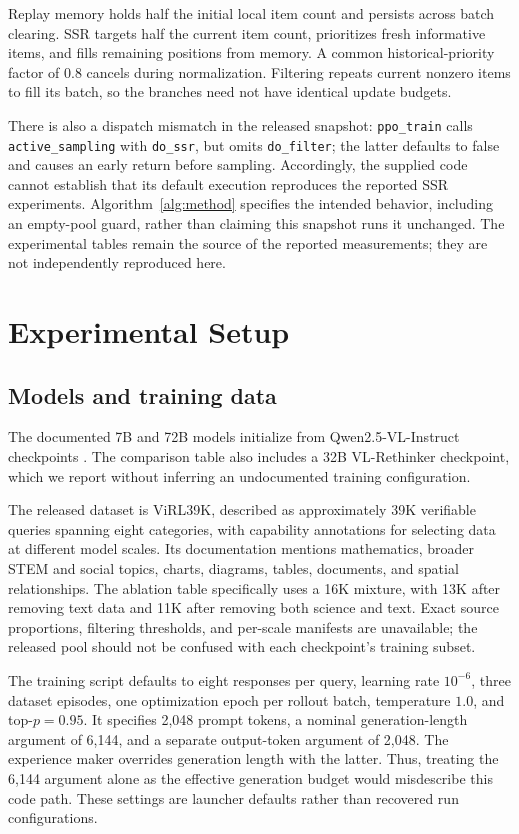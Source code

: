 \documentclass[10pt,twocolumn]{article}
\newcommand{\model}{VL-Rethinker\xspace}
\begin{document}
Replay memory holds half the initial local item count and persists across batch clearing. SSR targets half the current item count, prioritizes fresh informative items, and fills remaining positions from memory. A common historical-priority factor of $0.8$ cancels during normalization. Filtering repeats current nonzero items to fill its batch, so the branches need not have identical update budgets.

There is also a dispatch mismatch in the released snapshot: \texttt{ppo\_train} calls \texttt{active\_sampling} with \texttt{do\_ssr}, but omits \texttt{do\_filter}; the latter defaults to false and causes an early return before sampling. Accordingly, the supplied code cannot establish that its default execution reproduces the reported SSR experiments. Algorithm~\ref{alg:method} specifies the intended behavior, including an empty-pool guard, rather than claiming this snapshot runs it unchanged. The experimental tables remain the source of the reported measurements; they are not independently reproduced here.


\section{Experimental Setup}
\label{sec:setup}
\subsection{Models and training data}
The documented 7B and 72B models initialize from Qwen2.5-VL-Instruct checkpoints \citep{qwen2_5_vl}. The comparison table also includes a 32B \model checkpoint, which we report without inferring an undocumented training configuration. 

The released dataset is ViRL39K, described as approximately 39K verifiable queries spanning eight categories, with capability annotations for selecting data at different model scales. Its documentation mentions mathematics, broader STEM and social topics, charts, diagrams, tables, documents, and spatial relationships. The ablation table specifically uses a 16K mixture, with 13K after removing text data and 11K after removing both science and text. Exact source proportions, filtering thresholds, and per-scale manifests are unavailable; the released pool should not be confused with each checkpoint's training subset.

The training script defaults to eight responses per query, learning rate $10^{-6}$, three dataset episodes, one optimization epoch per rollout batch, temperature $1.0$, and top-$p=0.95$. It specifies 2,048 prompt tokens, a nominal generation-length argument of 6,144, and a separate output-token argument of 2,048. The experience maker overrides generation length with the latter. Thus, treating the 6,144 argument alone as the effective generation budget would misdescribe this code path. These settings are launcher defaults rather than recovered run configurations.
\end{document}
